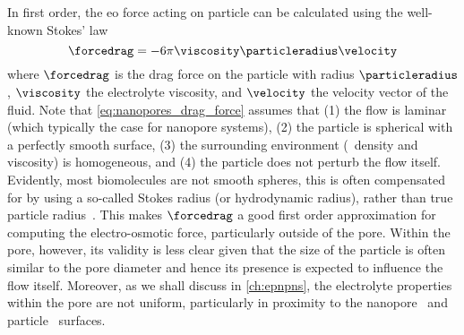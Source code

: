 In first order, the \gls{eo} force acting on particle can be calculated using the well-known Stokes' law
%
\begin{equation}\label{eq:nanopores_drag_force}
  \forcedrag = - 6 \pi \viscosity \particleradius \velocity
\end{equation}
%
where $\forcedrag$ is the drag force on the particle with radius $\particleradius$, $\viscosity$ the
electrolyte viscosity, and $\velocity$ the velocity vector of the fluid. Note that
\cref{eq:nanopores_drag_force} assumes that (1) the flow is laminar (which typically the case for nanopore
systems\footnotemark),%
%
%
%
(2) the particle is spherical with a perfectly smooth surface, (3) the surrounding environment (\ie~density
and viscosity) is homogeneous, and (4) the particle does not perturb the flow itself. Evidently, most
biomolecules are not smooth spheres, this is often compensated for by using a so-called Stokes radius (or
hydrodynamic radius), rather than true particle radius~\cite{Ortega-2011}. This makes $\forcedrag$ a good
first order approximation for computing the electro-osmotic force, particularly outside of the pore. Within
the pore, however, its validity is less clear given that the size of the particle is often similar to the pore
diameter and hence its presence is expected to influence the flow itself. Moreover, as we shall discuss in
\cref{ch:epnpns}, the electrolyte properties within the pore are not uniform, particularly in proximity to the
nanopore~\cite{Qiao-Aluru-2003,Vo-2016,Hsu-2017,Ye-2011} and particle~\cite{Pronk-2014,Makarov-1998} surfaces.

